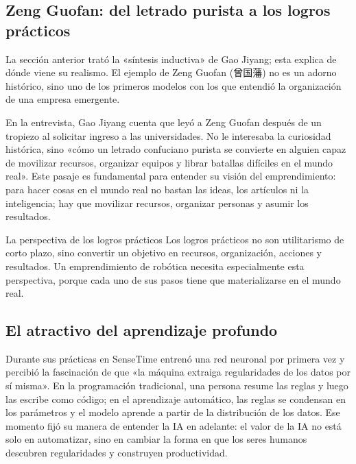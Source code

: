 \documentclass[a4paper]{article}
\begin{document}
\subsection{Zeng Guofan: del letrado purista a los logros prácticos}

La sección anterior trató la «síntesis inductiva» de Gao Jiyang; esta explica de dónde viene su realismo. El ejemplo de Zeng Guofan (曾国藩) no es un adorno histórico, sino uno de los primeros modelos con los que entendió la organización de una empresa emergente.

En la entrevista, Gao Jiyang cuenta que leyó a Zeng Guofan después de un tropiezo al solicitar ingreso a las universidades. No le interesaba la curiosidad histórica, sino «cómo un letrado confuciano purista se convierte en alguien capaz de movilizar recursos, organizar equipos y librar batallas difíciles en el mundo real». Este pasaje es fundamental para entender su visión del emprendimiento: para hacer cosas en el mundo real no bastan las ideas, los artículos ni la inteligencia; hay que movilizar recursos, organizar personas y asumir los resultados.

\begin{importantbox}{La perspectiva de los logros prácticos}
Los logros prácticos no son utilitarismo de corto plazo, sino convertir un objetivo en recursos, organización, acciones y resultados. Un emprendimiento de robótica necesita especialmente esta perspectiva, porque cada uno de sus pasos tiene que materializarse en el mundo real.
\end{importantbox}

\subsection{El atractivo del aprendizaje profundo}

Durante sus prácticas en SenseTime entrenó una red neuronal por primera vez y percibió la fascinación de que «la máquina extraiga regularidades de los datos por sí misma». En la programación tradicional, una persona resume las reglas y luego las escribe como código; en el aprendizaje automático, las reglas se condensan en los parámetros y el modelo aprende a partir de la distribución de los datos. Ese momento fijó su manera de entender la IA en adelante: el valor de la IA no está solo en automatizar, sino en cambiar la forma en que los seres humanos descubren regularidades y construyen productividad.
\end{document}
